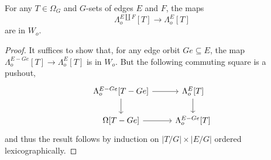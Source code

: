 \documentclass[a4paper,10pt,draft]{article}%
\begin{document}
\begin{proposition}
      \label{GORB_OHORN_PROP}
      For any $T \in \Omega_G$ and $G$-sets of edges $E$ and $F$,
      the maps
      \begin{equation}
            \Lambda^{E \amalg F}_o[T] \to \Lambda^{E}_o[T]
      \end{equation}
      are in $W_o$.
\end{proposition}
\begin{proof}
      It suffices to show that,
      for any edge orbit $G e \subseteq E$,
      the map $\Lambda^{E - G e}_o[T] \to \Lambda^{E}_o[T]$ is in $W_o$.
      But the following commuting square is a pushout,
      \begin{equation}
            \begin{tikzcd}
                  \Lambda^{E - G e}_o[T - Ge] \arrow[r] \arrow[d]
                  &
                  \Lambda^{E}_o[T] \arrow[d]
                  \\
                  \Omega[T - G e] \arrow[r]
                  &
                  \Lambda^{E - G e}_o[T]
            \end{tikzcd}
      \end{equation}
      and thus the result follows by induction on $|T/G| \times |E/G|$ ordered lexicographically.
\end{proof}
\end{document}

